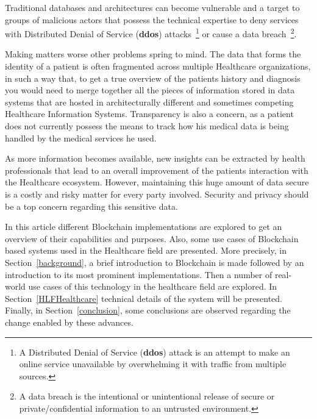 Traditional databases and architectures can become vulnerable and a target to
groups of malicious actors that possess the technical expertise to deny
services with Distributed Denial of Service (\textbf{ddos})
attacks~\footnote[1]{A Distributed Denial of Service (\textbf{ddos}) attack is
an attempt to make an online service unavailable by overwhelming it with
traffic from multiple sources.} or cause a data breach~\footnote[2]{A data
breach is the intentional or unintentional release of secure or
private/confidential information to an untrusted environment.}. 

Making matters worse other problems spring to mind. The data that forms the
identity of a patient is often fragmented across multiple Healthcare
organizations, in such a way that, to get a true overview of the patients
history and diagnosis you would need to merge together all the pieces of
information stored in data systems that are hosted in architecturally different
and sometimes competing Healthcare Information Systems. Transparency is also a
concern, as a patient does not currently possess the means to track how his
medical data is being handled by the medical services he used.

As more information becomes available, new insights can be extracted by health
professionals that lead to an overall improvement of the patients interaction
with the Healthcare ecosystem. However, maintaining this huge amount of data
secure is a costly and risky matter for every party involved. Security and
privacy should be a top concern regarding this sensitive data. 

In this article different Blockchain implementations are explored to get an
overview of their capabilities and purposes. Also, some use cases of Blockchain
based systems used in the Healthcare field are presented. More precisely, in
Section~\ref{background}, a brief introduction to Blockchain is made followed
by an introduction to its most prominent implementations. Then a number of
real-world use cases of this technology in the healthcare field are explored.
In Section~\ref{HLFHealthcare} technical details of the system will be
presented. Finally, in Section~\ref{conclusion}, some conclusions are observed
regarding the change enabled by these advances.
